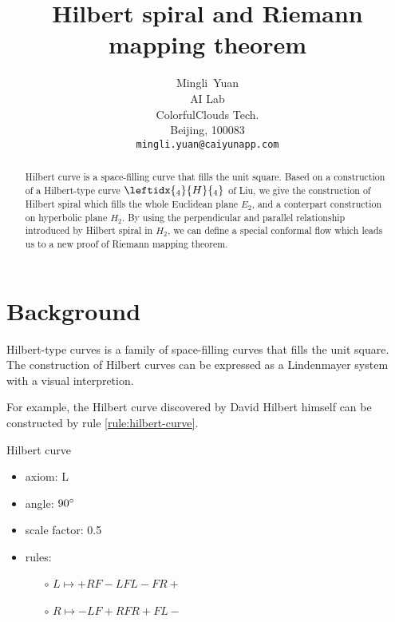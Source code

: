\documentclass{article}
\title{Hilbert spiral and Riemann mapping theorem}
\author{
  Mingli~Yuan \\
  AI Lab \\
  ColorfulClouds Tech.\\
  Beijing, 100083 \\
  \texttt{mingli.yuan@caiyunapp.com} \\
}
\begin{document}
\maketitle

\begin{abstract}
    Hilbert curve is a space-filling curve that fills the unit square.
    Based on a construction of a Hilbert-type curve $\leftidx{_4}{H}{_4}$ of Liu,
    we give the construction of Hilbert spiral which fills the whole Euclidean plane $E_2$,
    and a conterpart construction on hyperbolic plane $H_2$.
    By using the perpendicular and parallel relationship introduced by Hilbert spiral in $H_2$,
    we can define a special conformal flow which leads us to a new proof of Riemann mapping theorem.
\end{abstract}


\setcounter{tocdepth}{2}
\tableofcontents

\section{Background}\label{sec:background}

Hilbert-type curves is a family of space-filling curves that fills the unit square.
The construction of Hilbert curves can be expressed as a Lindenmayer system with a visual interpretion.

For example, the Hilbert curve discovered by David Hilbert himself can be constructed by
rule \ref{rule:hilbert-curve}.

\begin{lsystem}
    \label{rule:hilbert-curve}
    \caption{Hilbert curve}
    \begin{itemize}
      \item axiom: L
      \item angle: $90\degree$
      \item scale factor: 0.5
      \item rules: \begin{itemize}
          \item[$\circ$] $L \mapsto +RF-LFL-FR+ $
          \item[$\circ$] $R \mapsto -LF+RFR+FL- $
      \end{itemize}
    \end{itemize}
\end{lsystem}
\end{document}
